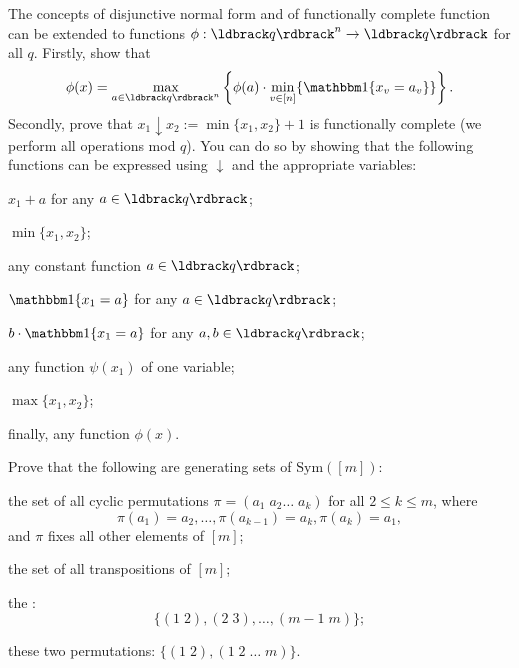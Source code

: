 \documentclass[a4paper, 11pt]{book}
\numberwithin{equation}{section}
\theoremstyle{plain}
\newcommand{\Sym}{\mathrm{Sym}}
\newcommand{\espace}{\;}
\renewcommand{\(}{\ldbrack}
\renewcommand{\)}{\rdbrack}
\newcommand{\BF}[1]{{\bf\boldmath{#1}\unboldmath}}
\newcommand{\one}[1]{{\mathbbm 1}\{ #1 \}}
\begin{document}
\begin{exercises}
\item The concepts of disjunctive normal form and of functionally complete function can be extended to functions $\phi : \(q\)^n \to \(q\)$ for all $q$. Firstly, show that
\[
	\phi(x) = \max_{a \in \(q\)^n} \left\{ \phi(a) \cdot \min_{v \in [n]} \{ \one{ x_v = a_v } \} \right\}.
\]
Secondly, prove that $x_1 \downarrow x_2 := \min\{x_1 ,x_2 \} + 1$ is functionally complete (we perform all operations mod $q$). You can do so by showing that the following functions can be expressed using $\downarrow$ and the appropriate variables:
\begin{exercises}
	\item $x_1 + a$ for any $a \in \(q\)$;
	\item $\min\{ x_1, x_2 \}$;
	\item any constant function $a \in \(q\)$;
	\item $\one{ x_1 = a}$ for any $a \in \(q\)$;
	\item $b \cdot \one{ x_1 = a }$ for any $a,b \in \(q\)$;
	\item any function $\psi(x_1)$ of one variable;
	\item $\max\{x_1, x_2\}$;
	\item finally, any function $\phi(x)$.
\end{exercises}







\item \label{exerc:generating_sets_symmetric_group} Prove that the following are generating sets of $\Sym([m])$:
\begin{exercises}
	\item the set of all cyclic permutations $\pi = (a_1 \espace a_2 \dots \espace a_k)$ for all $2 \le k \le m$, where
	\[
		\pi(a_1) = a_2, \dots, \pi(a_{k-1}) = a_k, \pi(a_k) = a_1,
	\]
	and $\pi$ fixes all other elements of $[m]$;
	
	\item the set of all transpositions of $[m]$;
	
	\item \label{it:coxeter_generators} the \BF{Coxeter generators}:
	\[
		\{ (1 \espace 2), (2 \espace 3), \dots, (m-1 \espace m) \};
	\]
	
	\item these two permutations: $\{ (1 \espace 2), (1 \espace 2 \espace \dots \espace m) \}$.
\end{exercises}


\end{exercises}
\end{document}
